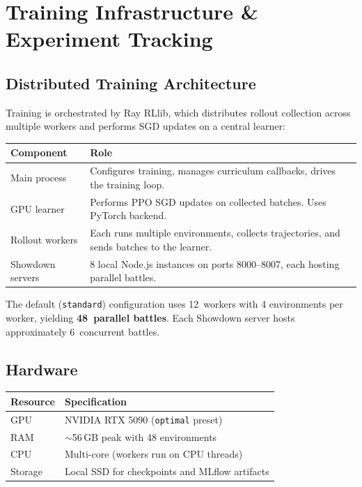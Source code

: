 \chapter{Training Infrastructure \& Experiment Tracking}
\label{ch:infrastructure}

\section{Distributed Training Architecture}

Training is orchestrated by Ray RLlib, which distributes rollout collection
across multiple workers and performs SGD updates on a central learner:

\begin{center}
\small
\begin{tabularx}{\textwidth}{l X}
  \toprule
  \textbf{Component} & \textbf{Role} \\
  \midrule
  Main process   & Configures training, manages curriculum callbacks,
                   drives the training loop. \\
  GPU learner     & Performs PPO SGD updates on collected batches.
                   Uses PyTorch backend. \\
  Rollout workers & Each runs multiple environments, collects trajectories,
                   and sends batches to the learner. \\
  Showdown servers & 8 local Node.js instances on ports 8000--8007,
                     each hosting parallel battles. \\
  \bottomrule
\end{tabularx}
\end{center}

The default (\texttt{standard}) configuration uses 12~workers with 4
environments per worker, yielding \textbf{48~parallel battles}.  Each Showdown
server hosts approximately 6~concurrent battles.

\section{Hardware}

\begin{center}
\small
\begin{tabularx}{0.8\textwidth}{l l}
  \toprule
  \textbf{Resource} & \textbf{Specification} \\
  \midrule
  GPU         & NVIDIA RTX 5090 (\texttt{optimal} preset) \\
  RAM         & $\sim$56\,GB peak with 48 environments \\
  CPU         & Multi-core (workers run on CPU threads) \\
  Storage     & Local SSD for checkpoints and MLflow artifacts \\
  \bottomrule
\end{tabularx}
\end{center}

